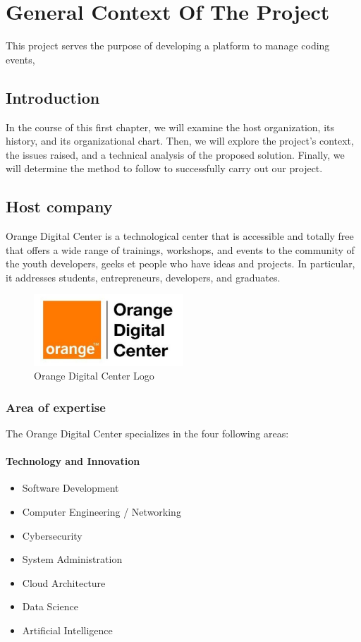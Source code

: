 \chapter{General Context Of The Project}
This project serves the purpose of developing a platform to manage coding
events,

\section{Introduction}
In the course of this first chapter,
we will examine the host organization,
 its history, and its organizational chart.
  Then, we will explore the project's context,
   the issues raised, and a technical analysis of the proposed solution. Finally,
    we will determine the method to follow to successfully carry out our project.


\section{Host company}
Orange Digital Center\cite{OrangeDigitalCenter} is a technological center that
is accessible and totally
free
that offers a wide range of trainings, workshops, and events to the community
of the
youth developers, geeks et people who have ideas and projects. In particular,
it addresses
students, entrepreneurs, developers, and graduates.

\begin{figure}[h]
      \centering
      \includegraphics[width=0.5\textwidth]{images/odc.png}
      \caption{Orange Digital Center Logo}
      \label{fig:Orange Digital Center Logo}
\end{figure}

\subsection{Area of expertise}
The Orange Digital Center specializes in the four following areas:
\subsubsection{Technology and Innovation}
\begin{itemize}
      \item Software Development
      \item Computer Engineering / Networking
      \item Cybersecurity
      \item System Administration
      \item Cloud Architecture
      \item Data Science
      \item Artificial Intelligence
\end{itemize}

